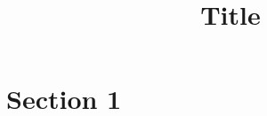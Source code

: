 \documentclass[11pt]{article}
\author{}
\title{Title}
\begin{document}
\maketitle

\section{Section 1}

%
%
\end{document}
